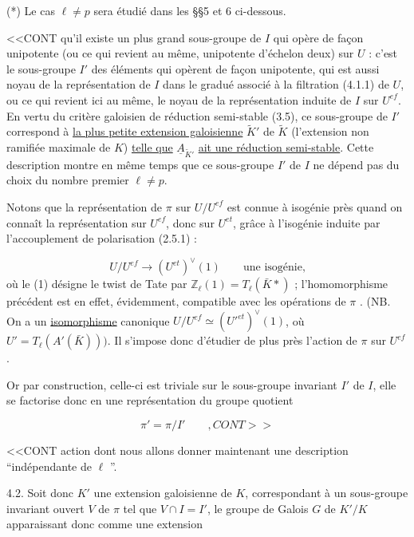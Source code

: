 (*) Le cas $\ell \neq p$ sera étudié dans les \S\S 5 et 6 ci-dessous.



<<CONT qu'il existe un plus grand sous-groupe de $I$ qui opère de façon unipotente (ou ce qui revient au même, unipotente d'échelon deux) sur $U$ : c'est le sous-groupe $I'$ des éléments qui opèrent de façon unipotente, qui est aussi noyau de la représentation de $I$ dans le gradué associé à la filtration (4.1.1) de $U$, ou ce qui revient ici au même, le noyau de la représentation induite de $I$ sur $U^{ef}$. En vertu du critère galoisien de réduction semi-stable (3.5), ce sous-groupe de $I'$ correspond à \underline{la plus petite extension galoisienne} $\tilde{K}'$ de $\tilde{K}$ (l'extension non ramifiée maximale de $K$) \underline{telle que} $\underline{A}_{\tilde{K}'}$ \underline{ait une réduction semi-stable}. Cette description montre en même temps que ce sous-groupe $I'$ de $I$ ne dépend pas du choix du nombre premier $\ell \neq p$.

Notons que la représentation de $\pi$ sur $U/U^{ef}$ est connue à isogénie près quand on connaît la représentation sur $U^{ef}$, donc sur $U^{et}$, grâce à l'isogénie induite par l'accouplement de polarisation (2.5.1) :

\begin{equation}\tag{4.1.2}
U/U^{ef} \longrightarrow (U^{et})^{\vee}(1) \qquad \mbox{une isogénie,}
\end{equation}
où le (1) désigne le twist de Tate par $\mathbb{Z}_\ell(1) = T_\ell(\bar{K}*)$ ; l'homomorphisme précédent est en effet, évidemment, compatible avec les opérations de $\pi$ . (NB. On a un \underline{isomorphisme} canonique $U/U^{ef} \simeq ({U'}^{et})^{\vee} (1)$, où $U' = T_\ell(A'(\bar{K})))$. Il s'impose donc d'étudier de plus près l'action de $\pi$ sur $U^{ef}$.

Or par construction, celle-ci est triviale sur le sous-groupe invariant $I'$ de $I$, elle se factorise donc en une représentation du groupe quotient

\begin{equation}\tag{4.1.3}
\pi' = \pi/I' \qquad , CONT>>
\end{equation}


<<CONT action dont nous allons donner maintenant une description ``indépendante de $\ell$ ''.

4.2. Soit donc $K'$ une extension galoisienne de $K$, correspondant à un sous-groupe invariant ouvert $V$ de $\pi$ tel que $V \cap I = I'$, le groupe de Galois $G$ de $K'/K$ apparaissant donc comme une extension

